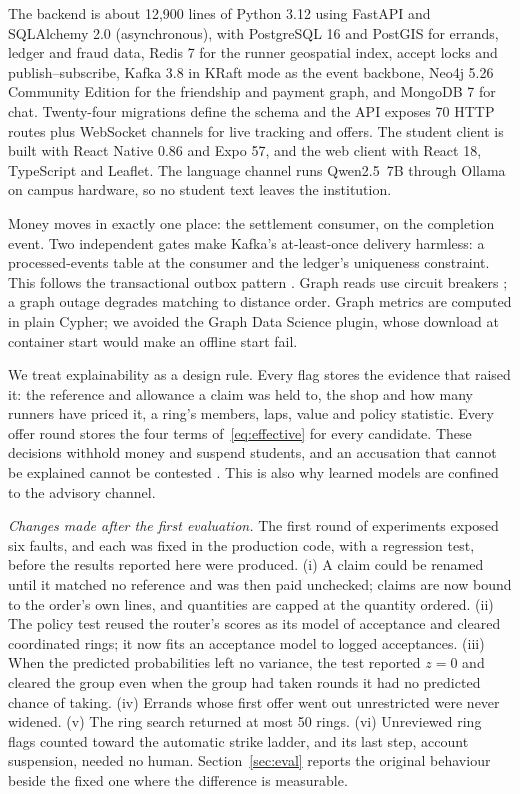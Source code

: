 \documentclass[journal]{IEEEtran}
\begin{document}
The backend is about 12,900 lines of Python 3.12 using FastAPI and SQLAlchemy 2.0
(asynchronous), with PostgreSQL 16 and PostGIS for errands, ledger and fraud data,
Redis 7 for the runner geospatial index, accept locks and publish--subscribe, Kafka
3.8 in KRaft mode as the event backbone, Neo4j 5.26 Community Edition for the
friendship and payment graph, and MongoDB 7 for chat. Twenty-four migrations define
the schema and the API exposes 70 HTTP routes plus WebSocket channels for live
tracking and offers. The student client is built with React Native 0.86 and Expo 57,
and the web client with React 18, TypeScript and Leaflet. The language channel runs
Qwen2.5~7B through Ollama on campus hardware, so no student text leaves the
institution.

Money moves in exactly one place: the settlement consumer, on the completion event.
Two independent gates make Kafka's at-least-once delivery harmless: a
processed-events table at the consumer and the ledger's uniqueness constraint. This
follows the transactional outbox pattern
\cite{richardson2018microservices,kleppmann2017designing}. Graph reads use circuit
breakers \cite{nygard2018release}; a graph outage degrades matching to distance order.
Graph metrics are computed in plain Cypher; we avoided the Graph Data Science plugin,
whose download at container start would make an offline start fail.

We treat explainability as a design rule. Every flag stores the evidence
that raised it: the reference and allowance a claim was held to, the shop and how
many runners have priced it, a ring's members, laps, value and policy statistic.
Every offer round stores the four terms of~\eqref{eq:effective} for every candidate.
These decisions withhold money and suspend students, and an accusation that cannot be
explained cannot be contested \cite{goodman2017european}. This is also why learned
models are confined to the advisory channel.

\emph{Changes made after the first evaluation.} The first round of experiments
exposed six faults, and each was fixed in the production code, with a regression
test, before the results reported here were produced. (i) A claim could be renamed
until it matched no reference and was then paid unchecked; claims are now bound to
the order's own lines, and quantities are capped at the quantity ordered. (ii) The
policy test reused the router's scores as its model of acceptance and cleared
coordinated rings; it now fits an acceptance model to logged acceptances. (iii) When
the predicted probabilities left no variance, the test reported $z=0$ and cleared the
group even when the group had taken rounds it had no predicted chance of taking.
(iv) Errands whose first offer went out unrestricted were never widened. (v) The ring
search returned at most 50 rings. (vi) Unreviewed ring flags counted toward the
automatic strike ladder, and its last step, account suspension, needed no human.
Section~\ref{sec:eval} reports the original behaviour beside the fixed one where the
difference is measurable.
\end{document}
